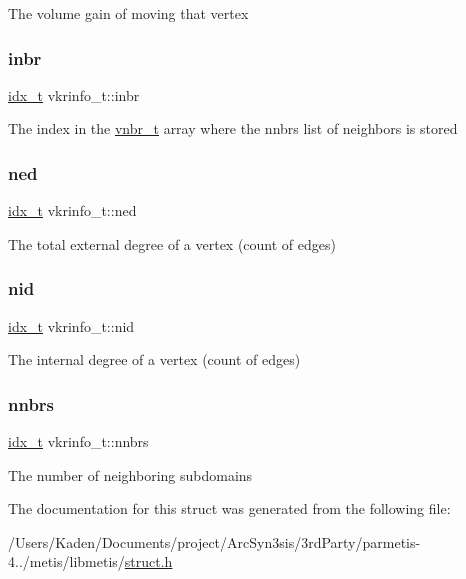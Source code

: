 The volume gain of moving that vertex \mbox{\label{a00726_a85a0150ff0f0fe87b0fc3bf445b60bca}} 
\subsubsection{\texorpdfstring{inbr}{inbr}}
{\footnotesize\ttfamily \hyperlink{a00876_aaa5262be3e700770163401acb0150f52}{idx\+\_\+t} vkrinfo\+\_\+t\+::inbr}

The index in the \hyperlink{a00722}{vnbr\+\_\+t} array where the nnbrs list of neighbors is stored \mbox{\label{a00726_a0af0fec11cab7aa7a343c268832cc709}} 
\subsubsection{\texorpdfstring{ned}{ned}}
{\footnotesize\ttfamily \hyperlink{a00876_aaa5262be3e700770163401acb0150f52}{idx\+\_\+t} vkrinfo\+\_\+t\+::ned}

The total external degree of a vertex (count of edges) \mbox{\label{a00726_a9befff2ea2c811563ad38aaf921a8f21}} 
\subsubsection{\texorpdfstring{nid}{nid}}
{\footnotesize\ttfamily \hyperlink{a00876_aaa5262be3e700770163401acb0150f52}{idx\+\_\+t} vkrinfo\+\_\+t\+::nid}

The internal degree of a vertex (count of edges) \mbox{\label{a00726_aa337d338d253918348c5ba9e4a5082ca}} 
\subsubsection{\texorpdfstring{nnbrs}{nnbrs}}
{\footnotesize\ttfamily \hyperlink{a00876_aaa5262be3e700770163401acb0150f52}{idx\+\_\+t} vkrinfo\+\_\+t\+::nnbrs}

The number of neighboring subdomains 

The documentation for this struct was generated from the following file\+:\begin{DoxyCompactItemize}
\item 
/\+Users/\+Kaden/\+Documents/project/\+Arc\+Syn3sis/3rd\+Party/parmetis-\/4../metis/libmetis/\hyperlink{a00972}{struct.\+h}\end{DoxyCompactItemize}
